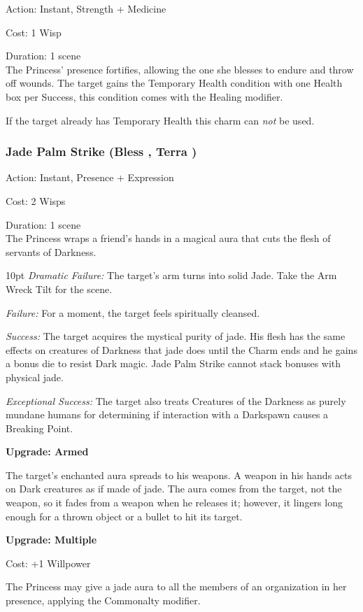 \noindent Action: Instant, Strength + Medicine

\noindent Cost: 1 Wisp

\noindent Duration: 1 scene \\

\noindent The Princess' presence fortifies, allowing the one she blesses to endure and throw off wounds. The target gains the Temporary Health condition with one Health box per Success, this condition comes with the Healing modifier. 

If the target already has Temporary Health this charm can \textit{not} be used. 

\subsubsection*{Jade Palm Strike (Bless \textbullet\textbullet\textbullet, Terra \textbullet\textbullet)}

\noindent Action: Instant, Presence + Expression

\noindent Cost: 2 Wisps

\noindent Duration: 1 scene \\

The Princess wraps a friend's hands in a magical aura that cuts the flesh of servants of Darkness.

\begin{myindentpar}{10pt}    \emph{Dramatic Failure:} The target's arm turns into solid Jade. Take the Arm Wreck Tilt for the scene. 

    \emph{Failure:} For a moment, the target feels spiritually cleansed.

    \emph{Success:} The target acquires the mystical purity of jade. His flesh has the same effects on creatures of Darkness that jade does until the Charm ends and he gains a bonus die to resist Dark magic. Jade Palm Strike cannot stack bonuses with physical jade. 
    
    \emph{Exceptional Success:} The target also treats Creatures of the Darkness as purely mundane humans for determining if interaction with a Darkspawn causes a Breaking Point. 


\textbf{Upgrade: Armed}

The target's enchanted aura spreads to his weapons. A weapon in his hands acts on Dark creatures as if made of jade. The aura comes from the target, not the weapon, so it fades from a weapon when he releases it; however, it lingers long enough for a thrown object or a bullet to hit its target.

\textbf{Upgrade: Multiple}

Cost: +1 Willpower

The Princess may give a jade aura to all the members of an organization in her presence, applying the Commonalty modifier.\end{myindentpar}


